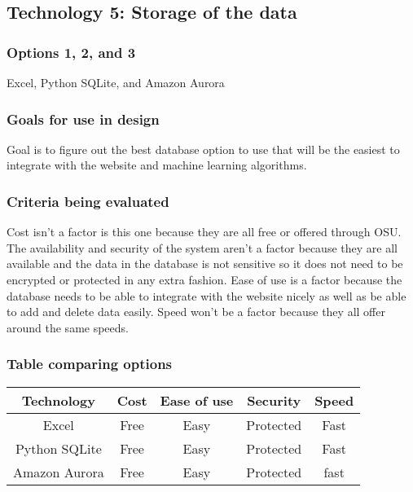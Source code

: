 \documentclass[journal,onecolumn]{IEEEtran}
\begin{document}
\subsection{Technology 5: Storage of the data}

\subsubsection{Options 1, 2, and 3}
Excel, Python SQLite, and Amazon Aurora
\subsubsection{Goals for use in design}
Goal is to figure out the best database option to use that will be the easiest to integrate with the website and machine learning algorithms.

\subsubsection{Criteria being evaluated}
Cost isn’t a factor is this one because they are all free or offered through OSU. The availability and security of the system aren’t a factor because they are all available and the data in the database is not sensitive so it does not need to be encrypted or protected in any extra fashion. Ease of use is a factor because the database needs to be able to integrate with the website nicely as well as be able to add and delete data easily. Speed won’t be a factor because they all offer around the same speeds.

\subsubsection{Table comparing options}



\begin{center}
 \begin{tabular}{||c | c | c | c | c||} 
 \hline
 Technology & Cost & Ease of use & Security & Speed \\ [0.5ex] 
 \hline\hline
 Excel & Free & Easy & Protected & Fast \\ 
 \hline
 Python SQLite & Free & Easy & Protected & Fast \\
 \hline
 Amazon Aurora & Free & Easy & Protected & fast \\ [1ex]
 \hline
\end{tabular}
\end{center}
\end{document}
